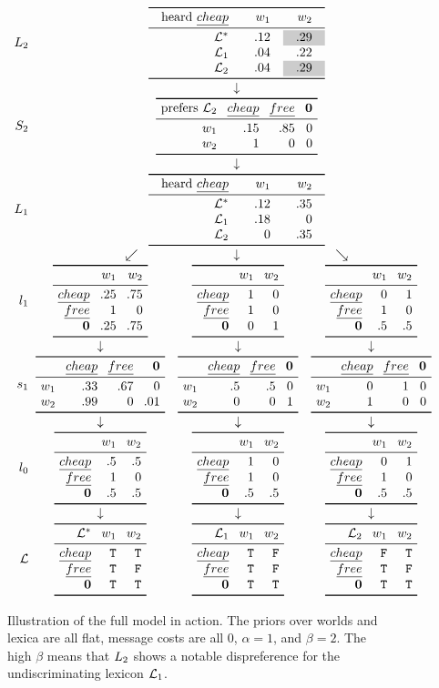 \documentclass[12pt,twoside]{article}
\renewcommand{\_}{\textbf{\textunderscore\hspace{-4pt}\textunderscore\hspace{-3pt}\textunderscore\hspace{-4pt}\textunderscore}\hspace{0.5pt}}			%
\begin{document}
\begin{figure}[htp]
  \centering
  \renewcommand{\arraystretch}{0.85}

  \newcommand{\singlearrowdivider}{& \multicolumn{3}{c}{\downarrow}}
  \newcommand{\straightarrowdivider}{& \downarrow & \downarrow & \downarrow}
  \newcommand{\angledarrowdivider}{& \multicolumn{3}{c}{\swarrow \hspace{75pt} \downarrow\hspace{75pt} \searrow}}

  \setlength{\arraycolsep}{12pt}
  $\begin{array}[c]{r@{\mspace{10mu}}c c c}
  \ListenerK[2] & \multicolumn{3}{c}{\examplejoint{\text{heard }\word{cheap}}{.12 & \graycell{.29}}{.04 & .22}{.04 & \graycell{.29}}}
  \\
  \singlearrowdivider
  \\
  \SpeakerK[2] & \multicolumn{3}{c}{\exampleSpeaker{\text{prefers } \Lex_{2}}{.15 & .85 & 0}{1 & 0 & 0}}
  \\
  \singlearrowdivider
  \\
  \ListenerK[1] & \multicolumn{3}{c}{\examplejoint{\text{heard }\word{cheap}}{.12 & .35}{.18 & 0}{0 & .35}}
  \\
  \angledarrowdivider
  \\
  \listenerOne & \examplelistener{.25 & .75}{1 & 0}{.25 & .75} & \examplelistener{1 & 0}{1 & 0}{0 & 1} & \examplelistener{0 & 1}{1 & 0}{.5 & .5}
  \\
  \straightarrowdivider
  \\
  \speakerOne & \examplespeaker{.33 & .67 & 0}{.99 & 0 & .01} & \examplespeaker{.5 & .5 & 0}{0 & 0 & 1} & \examplespeaker{0 & 1 & 0}{1 & 0 & 0}
  \\
  \straightarrowdivider
  \\
  \listenerZero & \examplelistener{.5 & .5}{1 & 0}{.5 & .5} & \examplelistener{1 & 0}{1 & 0}{.5 & .5} & \examplelistener{0 & 1}{1 & 0}{.5 & .5}
  \\
  \straightarrowdivider
  \\
  \Lex & \examplelex[\LexStar]{\True & \True}  & \examplelex[\Lex_{1}]{\True & \False} & \examplelex[\Lex_{2}]{\False & \True}
  \end{array}$                                                                                          
  \caption{Illustration of the full model in action. 
    The priors over worlds and lexica are all flat, 
    message costs are all $0$,
    $\alpha=1$, and 
    $\beta=2$. 
    The high $\beta$ means that $\ListenerK[2]$ shows a notable dispreference for the undiscriminating lexicon $\Lex_{1}$.}
  \label{fig:simple-example}
\end{figure}
\end{document}
